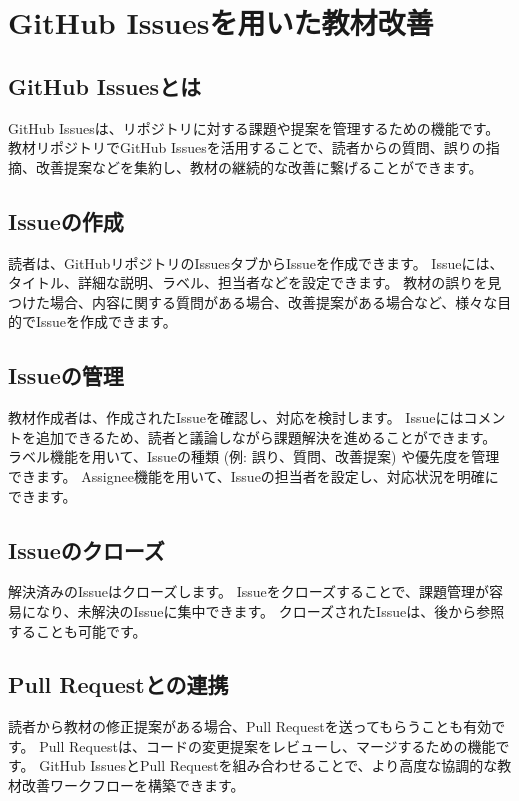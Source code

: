 \section{GitHub Issuesを用いた教材改善}

\subsection{GitHub Issuesとは}
GitHub Issuesは、リポジトリに対する課題や提案を管理するための機能です。
教材リポジトリでGitHub Issuesを活用することで、読者からの質問、誤りの指摘、改善提案などを集約し、教材の継続的な改善に繋げることができます。

\subsection{Issueの作成}
読者は、GitHubリポジトリのIssuesタブからIssueを作成できます。
Issueには、タイトル、詳細な説明、ラベル、担当者などを設定できます。
教材の誤りを見つけた場合、内容に関する質問がある場合、改善提案がある場合など、様々な目的でIssueを作成できます。

\subsection{Issueの管理}
教材作成者は、作成されたIssueを確認し、対応を検討します。
Issueにはコメントを追加できるため、読者と議論しながら課題解決を進めることができます。
ラベル機能を用いて、Issueの種類 (例: 誤り、質問、改善提案) や優先度を管理できます。
Assignee機能を用いて、Issueの担当者を設定し、対応状況を明確にできます。

\subsection{Issueのクローズ}
解決済みのIssueはクローズします。
Issueをクローズすることで、課題管理が容易になり、未解決のIssueに集中できます。
クローズされたIssueは、後から参照することも可能です。

\subsection{Pull Requestとの連携}
読者から教材の修正提案がある場合、Pull Requestを送ってもらうことも有効です。
Pull Requestは、コードの変更提案をレビューし、マージするための機能です。
GitHub IssuesとPull Requestを組み合わせることで、より高度な協調的な教材改善ワークフローを構築できます。
